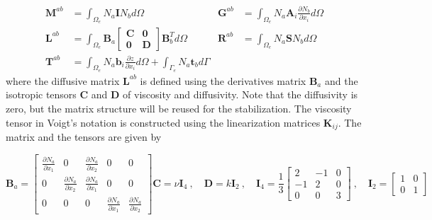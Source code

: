 \documentclass[a4paper,12pt]{elsarticle}
\newcommand{\pder}[2]{\frac{\partial#1}{\partial#2}}
\begin{document}
\begin{align} \label{discrete_sw_matrices}
    \displaystyle \mathbf{M}^{ab} &= \int_{\Omega_e}N_a \mathbf{I} N_b d\Omega &
    \displaystyle \mathbf{G}^{ab} &= \int_{\Omega_e}
        N_a \mathbf{A}_i \pder{N_b}{x_i} d\Omega \nonumber\\[5pt]
    \displaystyle \mathbf{L}^{ab} &= \int_{\Omega_e}
        \mathbf{B}_a \left[\begin{matrix}
            \mathbf{C} & \mathbf{0} \\ \mathbf{0} & \mathbf{D}
        \end{matrix}\right] \mathbf{B}_b^T d\Omega &
    \displaystyle \mathbf{R}^{ab} &= \int_{\Omega_e} N_a \mathbf{S} N_b d\Omega \\[5pt]
    \displaystyle \mathbf{T}^{ab} &= \int_{\Omega_e} N_a \mathbf{b}_i \pder{z}{x_i} d\Omega +
        \int_{\Gamma_e} N_a \mathbf{t}_b d\Gamma \nonumber
\end{align}
where the diffusive matrix $\mathbf{L}^{ab}$ is defined using the derivatives matrix $\mathbf{B}_a$ and the isotropic tensors $\mathbf{C}$ and $\mathbf{D}$ of viscosity and diffusivity. Note that the diffusivity is zero, but the matrix structure will be reused for the stabilization. The viscosity tensor in Voigt's notation is constructed using the linearization matrices $\mathbf{K}_{ij}$.
The matrix and the tensors are given by

\begin{subequations}
\begin{equation}
\mathbf{B}_a = \left[\begin{matrix}
    \pder{N_a}{x_1} & 0 & \pder{N_a}{x_2} & 0 & 0 \\
    0 & \pder{N_a}{x_2} & \pder{N_a}{x_1} & 0 & 0 \\
    0 & 0 & 0 & \pder{N_a}{x_1} & \pder{N_a}{x_2}
\end{matrix}\right]
\end{equation}
\begin{equation}
\mathbf{C} = \nu \mathbf{I}_4 \ , \quad
\mathbf{D} = k \mathbf{I}_2 \ , \quad
\mathbf{I}_4 = \frac{1}{3} \left[\begin{matrix}
        2 & -1 & 0 \\
        -1 & 2 & 0 \\
        0 & 0 & 3
    \end{matrix}\right] \ , \quad
\mathbf{I}_2 = \left[\begin{matrix}
        1 & 0 \\
        0 & 1
    \end{matrix}\right]
\end{equation}
\end{subequations}
\end{document}
